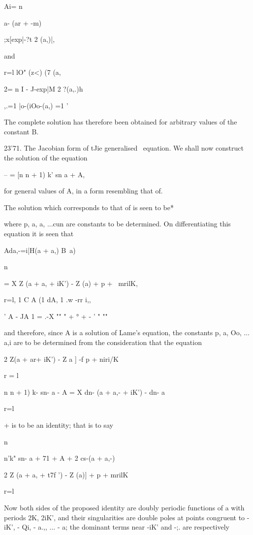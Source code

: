 {{{{{{{{Ai= n

a- (ar + -m)

;x[exp|-?t 2 (a,)|,

and

r=l lO" (z<) (7 (a,

 2= n I - J-exp|M 2 ?(a,.)h

,.=1 |o-(iOo-(a,) =1 '

The complete solution has therefore been obtained for arbitrary values
of the constant B.

%
%

23'71. The Jacobian form of tJie generalised \Lame\ equation. We shall
now construct the solution of the equation

-- = [n n + 1) k' sn a + A,

for general values of A, in a form resembling that of.

The solution which corresponds to that of is seen to be*

where p, a, a, ...cun are constants to be determined. On
differentiating this equation it is seen that

Ada,-=i|H(a + a,) B\ a)\ \

n

= X Z (a + a, + iK') - Z (a) + p + \ mrilK,

r=l, 1 C A (1 dA, 1 .w -rr i,,

   ' A - JA 1 = .-X "" " + ° + - ' " ""

and therefore, since A is a solution of Lame's equation, the constants
p, a, Oo, ... a,i are to be determined from the consideration that
the equation

2 Z(a + ar+ iK') - Z a ] -f p + niri/K

r = l

n n + 1) k- sn- a - A = X dn- (a + a,- + iK') - dn- a

r=l

+ is to be an identity; that is to say

n

n'k" sn- a + 71 + A + 2 cs-(a + a,-)

2 Z (a + a, + t7f ') - Z (a)] + p + mrilK

r=l

Now both sides of the proposed identity are doubly periodic functions
of a with periods 2K, 2iK', and their singularities are double poles
at points congruent to -iK', - Qi, - a.,, ... - a; the dominant terms
near -iK' and -;. are respectively

}}}}}}}}
